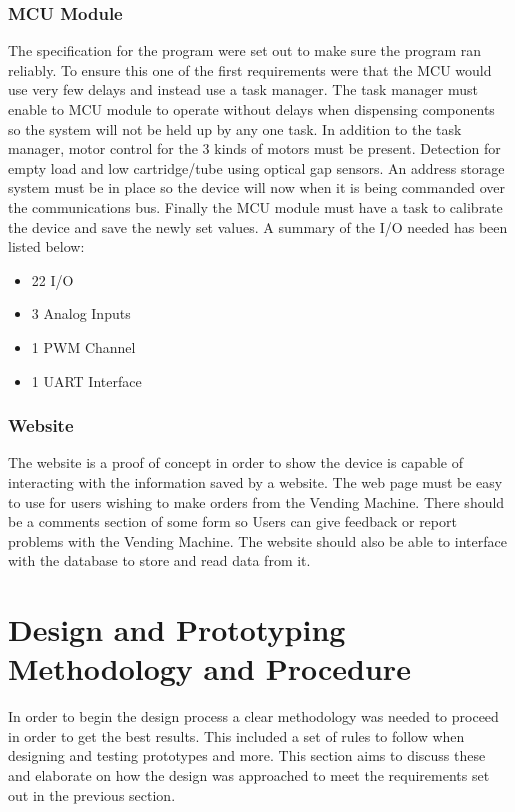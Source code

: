 \documentclass[a4paper,11pt]{article}
\numberwithin{figure}{section}
\numberwithin{table}{section}
\begin{document}
\subsubsection{MCU Module}
\label{subsec:mcuspec}
The specification for the program were set out to make sure the program ran reliably. To ensure this one of the first requirements were that the MCU would use very few delays and instead use a task manager. The task manager must enable to MCU module to operate without delays when dispensing components so the system will not be held up by any one task. In addition to the task manager, motor control for the 3 kinds of motors must be present. Detection for empty load and low cartridge/tube using optical gap sensors. An address storage system must be in place so the device will now when it is being commanded over the communications bus. Finally the MCU module must have a task to calibrate the device and save the newly set values. A summary of the I/O needed has been listed below:
	
	\begin{itemize}
	\setlength\itemsep{0em}
	\item 22 I/O
	\item 3 Analog Inputs
	\item 1 PWM Channel
	\item 1 UART Interface		
	\end{itemize}
	
\subsubsection{Website}
The website is a proof of concept in order to show the device is capable of interacting with the information saved by a website. The web page must be easy to use for users wishing to make orders from the Vending Machine. There should be a comments section of some form so Users can give feedback or report problems with the Vending Machine. The website should also be able to interface with the database to store and read data from it.

\newpage
\section{Design and Prototyping Methodology and Procedure}
	In order to begin the design process a clear methodology was needed to proceed in order to get the best results. This included a set of rules to follow when designing and testing prototypes and more. This section aims to discuss these and elaborate on how the design was approached to meet the requirements set out in the previous section.
\end{document}
